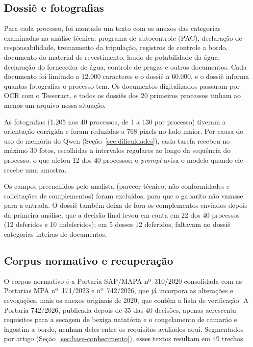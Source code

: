 \subsection{Dossiê e fotografias}

Para cada processo, foi montado um texto com os anexos das categorias examinadas na análise técnica: programa de autocontrole (PAC), declaração de responsabilidade, treinamento da tripulação, registros de controle a bordo, documento do material de revestimento, laudo de potabilidade da água, declaração do fornecedor de água, controle de pragas e outros documentos. Cada documento foi limitado a 12.000 caracteres e o dossiê a 60.000, e o dossiê informa quantas fotografias o processo tem. Os documentos digitalizados passaram por OCR com o Tesseract, e todos os dossiês dos 20 primeiros processos tinham ao menos um arquivo nessa situação.

As fotografias (1.205 nos 40 processos, de 1 a 130 por processo) tiveram a orientação corrigida e foram reduzidas a 768 pixels no lado maior. Por causa do uso de memória do Qwen (Seção~\ref{sec:dificuldades}), cada tarefa recebeu no máximo 30 fotos, escolhidas a intervalos regulares ao longo da sequência do processo, o que afetou 12 dos 40 processos; o \textit{prompt} avisa o modelo quando ele recebe uma amostra.

Os campos preenchidos pelo analista (parecer técnico, não conformidades e solicitações de complementos) foram excluídos, para que o gabarito não vazasse para a entrada. O dossiê também deixa de fora os complementos enviados depois da primeira análise, que a decisão final levou em conta em 22 dos 40 processos (12 deferidos e 10 indeferidos); em 5 desses 12 deferidos, faltavam no dossiê categorias inteiras de documentos.

\subsection{Corpus normativo e recuperação}

O corpus normativo é a Portaria SAP/MAPA nº~310/2020 consolidada com as Portarias MPA nº~171/2023 e nº~742/2026, que já incorpora as alterações e revogações, mais os anexos originais de 2020, que contêm a lista de verificação. A Portaria 742/2026, publicada depois de 35 das 40 decisões, apenas acrescenta requisitos para a secagem de bexiga natatória e o congelamento de camarão e lagostim a bordo, nenhum deles entre os requisitos avaliados aqui. Segmentados por artigo (Seção~\ref{sec:base-conhecimento}), esses textos resultam em 49 trechos.

